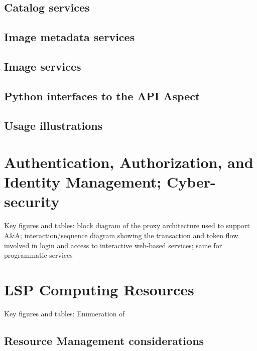 \subsection{Catalog services}

\subsection{Image metadata services}

\subsection{Image services}

\subsection{Python interfaces to the API Aspect}

\subsection{Usage illustrations}

\section{Authentication, Authorization, and Identity Management; Cyber-security}


Key figures and tables: block diagram of the proxy architecture used to support A&A; interaction/sequence diagram showing the transaction and token flow involved in login and access to interactive web-based services; same for programmatic services

\section{LSP Computing Resources}


Key figures and tables: Enumeration of 

\subsection{Resource Management considerations}

